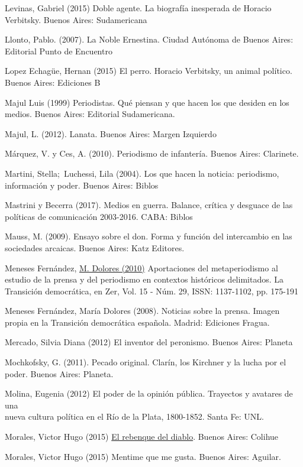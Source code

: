 Levinas, Gabriel (2015) Doble agente. La biografía inesperada de Horacio Verbitsky. Buenos Aires: Sudamericana

Llonto, Pablo. (2007). La Noble Ernestina. Ciudad Autónoma de Buenos Aires: Editorial Punto de Encuentro

Lopez Echagüe, Hernan (2015) El perro. Horacio Verbitsky, un animal político. Buenos Aires: Ediciones B

Majul Luis (1999) Periodistas. Qué piensan y que hacen los que desiden en los medios. Buenos Aires: Editorial Sudamericana.

Majul, L. (2012). Lanata. Buenos Aires: Margen Izquierdo

Márquez, V. y Ces, A. (2010). Periodismo de infantería. Buenos Aires: Clarinete.

Martini, Stella;~Luchessi, Lila (2004). Los que hacen la noticia: periodismo, información y poder. Buenos Aires: Biblos

Mastrini y Becerra (2017). Medios en guerra. Balance, crítica y desguace de las políticas de comunicación 2003-2016. CABA: Biblos

Mauss, M. (2009). Ensayo sobre el don. Forma y función del intercambio en las sociedades arcaicas. Buenos Aires: Katz Editores.

Meneses Fernández, \href{https://www.researchgate.net/profile/Maria_Meneses_Fernandez}{M. Dolores (2010)} Aportaciones del metaperiodismo al estudio de la prensa y del periodismo en contextos históricos delimitados. La Transición democrática, en Zer, Vol. 15 - Núm. 29, ISSN: 1137-1102, pp. 175-191

Meneses Fernández, María Dolores (2008). Noticias sobre la prensa. Imagen propia en la Transición democrática española. Madrid: Ediciones Fragua.

Mercado, Silvia Diana (2012) El inventor del peronismo. Buenos Aires: Planeta

Mochkofsky, G. (2011). Pecado original. Clarín, los Kirchner y la lucha por el poder. Buenos Aires: Planeta.

Molina, Eugenia (2012) El poder de la opinión pública. Trayectos y avatares de una\\
nueva cultura política en el Río de la Plata, 1800-1852. Santa Fe: UNL.

Morales, Victor Hugo (2015) \href{http://www.cuspide.com/9789876842686/El+Rebenque+Del+Diablo/}{El rebenque del diablo}. Buenos Aires: Colihue

Morales, Victor Hugo (2015) Mentime que me gusta. Buenos Aires: Aguilar.

